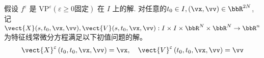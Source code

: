 \begin{definition}
    假设 $f^{\varepsilon}$ 是 $\text{VP}^{\varepsilon}(\varepsilon \geqslant 0 \text{固定})$ 在 $I$ 上的解. 对任意的$t_{0} \in I, (\vx,\vv) \in \bbR^{2 N}$, 记 $\vect{X}( s , t_0,\vx,\vv), \vect{V}( s , t_0,\vx,\vv) : I \times I \times \bbR^N \times \bbR^N \rightarrow \bbR^n$ 为特征线常微分方程满足以下初值问题的解。
    $$\vect{X}^{\varepsilon}\left(t_{0}, t_{0}, \vx,\vv \right)=\vx, \quad \vect{V}^{\varepsilon}\left(t_{0}, t_{0}, \vx,\vv \right)=\vv$$

    

\end{definition}

